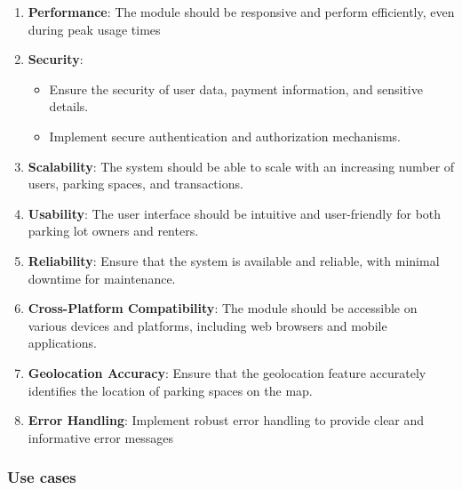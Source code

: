 \begin{enumerate}
    \item \textbf{Performance}: The module should be responsive and perform eﬀiciently, even during peak usage times
    \item \textbf{Security}:
        \begin{itemize}
            \item Ensure the security of user data, payment information, and sensitive details.
            \item Implement secure authentication and authorization mechanisms.
        \end{itemize}
    \item \textbf{Scalability}: The system should be able to scale with an increasing number of users, parking spaces, and transactions.
    \item \textbf{Usability}: The user interface should be intuitive and user-friendly for both parking lot owners and renters.
    \item \textbf{Reliability}: Ensure that the system is available and reliable, with minimal downtime for maintenance.
    \item \textbf{Cross-Platform Compatibility}: The module should be accessible on various devices and platforms, including web browsers and mobile applications.
    \item \textbf{Geolocation Accuracy}: Ensure that the geolocation feature accurately identifies the
    location of parking spaces on the map.
    \item \textbf{Error Handling}: Implement robust error handling to provide clear and informative error messages
\end{enumerate}

\subsubsection{Use cases}

